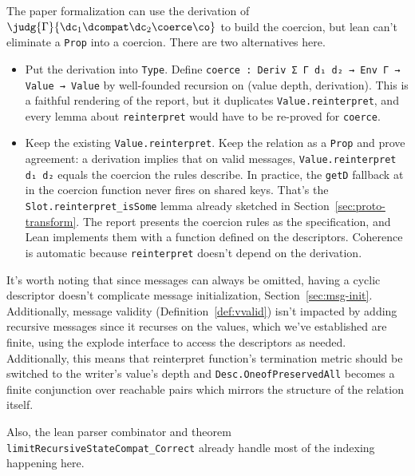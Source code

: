The paper formalization can use the derivation of
$\judg{\Gamma}{\dc_1 \dcompat \dc_2 \coerce \co}$ to build the coercion, but lean can't
eliminate a \texttt{Prop} into a coercion. There are two alternatives here.
\begin{itemize}
\item Put the derivation into \texttt{Type}. Define \texttt{coerce : Deriv Σ Γ
    d₁ d₂ → Env Γ → Value → Value} by well-founded recursion on (value depth,
  derivation). This is a faithful rendering of the report, but it duplicates
  \texttt{Value.reinterpret}, and every lemma about \texttt{reinterpret} would
  have to be re-proved for \texttt{coerce}.
\item Keep the existing \texttt{Value.reinterpret}. Keep the relation as a
  \texttt{Prop} and prove agreement: a derivation implies that on valid
  messages, \texttt{Value.reinterpret d₁ d₂} equals the coercion the rules
  describe. In practice, the \texttt{getD} fallback at in the coercion function
  never fires on shared keys. That's the \texttt{Slot.reinterpret\_isSome} lemma
  already sketched in Section~\ref{sec:proto-transform}. The report presents the
  coercion rules as the specification, and Lean implements them with a function
  defined on the descriptors. Coherence is automatic because
  \texttt{reinterpret} doesn't depend on the derivation.
\end{itemize}

It's worth noting that since messages can always be omitted, having a cyclic
descriptor doesn't complicate message initialization,
Section~\ref{sec:msg-init}. Additionally, message validity
(Definition~\ref{def:vvalid}) isn't impacted by adding recursive messages since
it recurses on the values, which we've established are finite, using the explode
interface to access the descriptors as needed. Additionally, this means that
reinterpret function's termination metric should be switched to the writer's
value's depth and \texttt{Desc.OneofPreservedAll} becomes a finite conjunction
over reachable pairs which mirrors the structure of the relation itself. %

Also, the lean parser combinator and theorem
\texttt{limitRecursiveStateCompat\_Correct} already handle most of the indexing
happening here.

